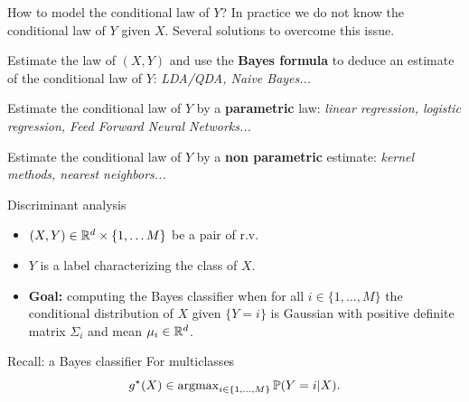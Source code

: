 \documentclass[xcolor={usenames,dvipsnames},handout]{beamer}
\begin{document}
\begin{frame}{How to model the conditional law of $Y$?}
 In practice \alert{we do not know  the conditional law of $Y$ given $X$}. Several solutions to overcome this issue.


\vspace{.4cm}


    
     Estimate the law of $(X,Y)$
      and use the \textbf{Bayes formula} to deduce an estimate of
      the conditional law of $Y$: \emph{LDA/QDA, Naive Bayes...}

\vspace{.3cm}

    
     Estimate the conditional law of
      $Y$ by a \textbf{parametric} law: \emph{linear regression, logistic regression, Feed Forward Neural Networks...}

\vspace{.3cm}

    
     Estimate the conditional  law of
      $Y$ by a \textbf{non parametric} estimate: \emph{kernel
        methods, nearest neighbors...}

 
\end{frame}
\begin{frame}{Discriminant analysis}	
\begin{itemize}
	\item $(X, Y) \in \mathbb{R}^d \times \{1, \hdots M\}$ be a pair of r.v.\, 

\vspace{.2cm}

	\item $Y$ is a label characterizing the class of $X$.

\vspace{.2cm}

	\item \textbf{Goal:} computing the Bayes classifier when for all $i \in \{1, \hdots , M\}$ the conditional distribution of \alert{$X$ given $\{Y = i \}$  is Gaussian with  positive definite matrix $\Sigma_i$ and mean  $\mu_i \in \mathbb{R}^d$}.

\end{itemize}

\vspace{.3cm}

\begin{exampleblock}{Recall: a Bayes classifier}
	For multiclasses
	$$
		g^\star(X) \in \operatorname{argmax}_{i \in \{1,\ldots,M\}}\mathbb{P} (Y=i | X).
	$$
\end{exampleblock}




\end{frame}
\end{document}
